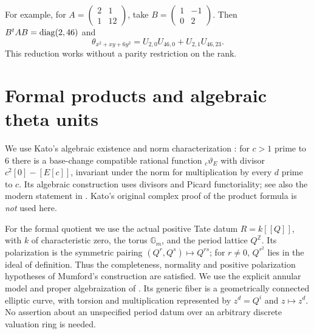 \documentclass[11pt]{article}
\theoremstyle{remark}\newtheorem{remark}[theorem]{Remark}
\newcommand{\Z}{\mathbb Z}\newcommand{\Q}{\mathbb Q}
\begin{document}
For example, for $A=\left(\begin{smallmatrix}2&1\\1&12\end{smallmatrix}\right)$,
take $B=\left(\begin{smallmatrix}1&-1\\0&2\end{smallmatrix}\right)$.
Then $B^tAB=\operatorname{diag}(2,46)$ and
\[
 \theta_{x^2+xy+6y^2}=U_{2,0}U_{46,0}+U_{2,1}U_{46,23}.
\]
This reduction works without a parity restriction on the rank.

\section{Formal products and algebraic theta units}\label{tate}
We use Kato's algebraic existence and norm characterization
\cite[Proposition 1.3(1)]{kato}: for $c>1$ prime to $6$ there is a
base-change compatible rational function ${}_c\vartheta_E$ with divisor
$c^2[0]-[E[c]]$, invariant under the norm for multiplication by every
$d$ prime to $c$. Its algebraic construction uses divisors and Picard
functoriality; see also the modern statement in
\cite[Theorem 4.1.1]{klz}. Kato's original complex proof of the product formula is
\emph{not} used here.

For the formal quotient we use the actual positive Tate datum
$R=k[[Q]]$, with $k$ of characteristic zero, the torus $\mathbb G_m$,
and the period lattice $Q^{\Z}$. Its polarization is the symmetric
pairing $(Q^r,Q^s)\mapsto Q^{rs}$; for $r\ne0$, $Q^{r^2}$ lies in
the ideal of definition. Thus the completeness, normality and positive
polarization hypotheses of Mumford's construction
\cite[Theorem 3.10, Corollary 4.9, Theorem 4.10]{mumford} are satisfied.
We use the explicit annular model and proper algebraization of
\cite[Corollary 2.2.4 and Section 2.5]{conrad}. Its generic fiber is a
geometrically connected elliptic curve, with torsion and multiplication
represented by $z^d=Q^i$ and $z\mapsto z^d$. No assertion about an
unspecified period datum over an arbitrary discrete valuation ring is needed.
\end{document}
